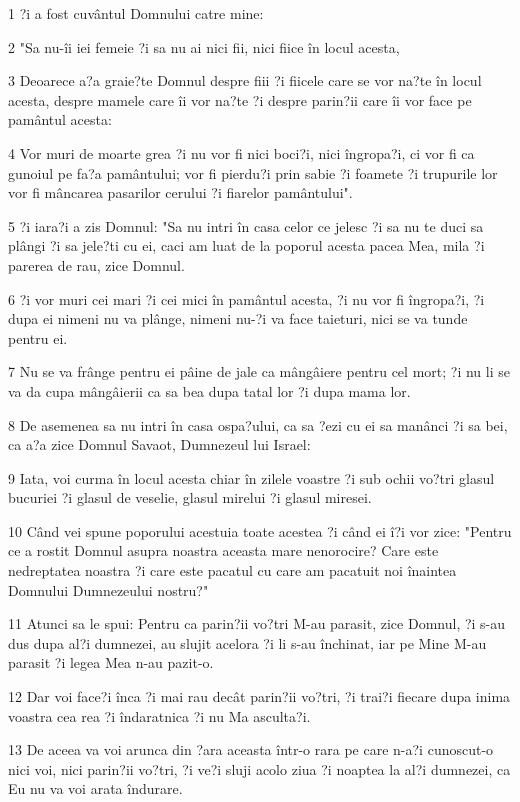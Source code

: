 \par 1 ?i a fost cuvântul Domnului catre mine:
\par 2 "Sa nu-îi iei femeie ?i sa nu ai nici fii, nici fiice în locul acesta,
\par 3 Deoarece a?a graie?te Domnul despre fiii ?i fiicele care se vor na?te în locul acesta, despre mamele care îi vor na?te ?i despre parin?ii care îi vor face pe pamântul acesta:
\par 4 Vor muri de moarte grea ?i nu vor fi nici boci?i, nici îngropa?i, ci vor fi ca gunoiul pe fa?a pamântului; vor fi pierdu?i prin sabie ?i foamete ?i trupurile lor vor fi mâncarea pasarilor cerului ?i fiarelor pamântului".
\par 5 ?i iara?i a zis Domnul: "Sa nu intri în casa celor ce jelesc ?i sa nu te duci sa plângi ?i sa jele?ti cu ei, caci am luat de la poporul acesta pacea Mea, mila ?i parerea de rau, zice Domnul.
\par 6 ?i vor muri cei mari ?i cei mici în pamântul acesta, ?i nu vor fi îngropa?i, ?i dupa ei nimeni nu va plânge, nimeni nu-?i va face taieturi, nici se va tunde pentru ei.
\par 7 Nu se va frânge pentru ei pâine de jale ca mângâiere pentru cel mort; ?i nu li se va da cupa mângâierii ca sa bea dupa tatal lor ?i dupa mama lor.
\par 8 De asemenea sa nu intri în casa ospa?ului, ca sa ?ezi cu ei sa manânci ?i sa bei, ca a?a zice Domnul Savaot, Dumnezeul lui Israel:
\par 9 Iata, voi curma în locul acesta chiar în zilele voastre ?i sub ochii vo?tri glasul bucuriei ?i glasul de veselie, glasul mirelui ?i glasul miresei.
\par 10 Când vei spune poporului acestuia toate acestea ?i când ei î?i vor zice: "Pentru ce a rostit Domnul asupra noastra aceasta mare nenorocire? Care este nedreptatea noastra ?i care este pacatul cu care am pacatuit noi înaintea Domnului Dumnezeului nostru?"
\par 11 Atunci sa le spui: Pentru ca parin?ii vo?tri M-au parasit, zice Domnul, ?i s-au dus dupa al?i dumnezei, au slujit acelora ?i li s-au închinat, iar pe Mine M-au parasit ?i legea Mea n-au pazit-o.
\par 12 Dar voi face?i înca ?i mai rau decât parin?ii vo?tri, ?i trai?i fiecare dupa inima voastra cea rea ?i îndaratnica ?i nu Ma asculta?i.
\par 13 De aceea va voi arunca din ?ara aceasta într-o rara pe care n-a?i cunoscut-o nici voi, nici parin?ii vo?tri, ?i ve?i sluji acolo ziua ?i noaptea la al?i dumnezei, ca Eu nu va voi arata îndurare.
